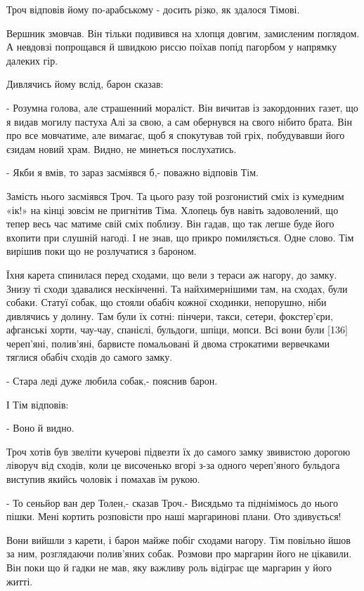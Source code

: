 Троч відповів йому по-арабському - досить різко, як здалося Тімові.

Вершник змовчав. Він тільки подивився на хлопця довгим, замисленим поглядом. А невдовзі попрощався й швидкою риссю поїхав попід пагорбом у напрямку далеких гір.

Дивлячись йому вслід, барон сказав:

- Розумна голова, але страшенний мораліст. Він вичитав із закордонних газет, що я видав могилу пастуха Алі за свою, а сам обернувся на свого нібито брата. Він про все мовчатиме, але вимагає, щоб я спокутував той гріх, побудувавши його єзидам новий храм. Видно, не минеться послухатись.

- Якби я вмів, то зараз засміявся б,- поважно відповів Тім.

Замість нього засміявся Троч. Та цього разу той розгонистий сміх із кумедним «ік!» на кінці зовсім не пригнітив Тіма. Хлопець був навіть задоволений, що тепер весь час матиме свій сміх поблизу. Він гадав, що так легше буде його вхопити при слушній нагоді. І не знав, що прикро помиляється. Одне слово. Тім вирішив поки що не розлучатися з бароном.

Їхня карета спинилася перед сходами, що вели з тераси аж нагору, до замку. Знизу ті сходи здавалися нескінченні. Та найхимернішими там, на сходах, були собаки. Статуї собак, що стояли обабіч кожної сходинки, непорушно, ніби дивлячись у долину. Там були їх сотні: пінчери, такси, сетери, фокстер'єри, афганські хорти, чау-чау, спанієлі, бульдоги, шпіци, мопси. Всі вони були [136] череп'яні, полив'яні, барвисте помальовані й двома строкатими вервечками тяглися обабіч сходів до самого замку.

- Стара леді дуже любила собак,- пояснив барон.

І Тім відповів:

- Воно й видно.

Троч хотів був звеліти кучерові підвезти їх до самого замку звивистою дорогою ліворуч від сходів, коли це височенько вгорі з-за одного череп'яного бульдога виступив якийсь чоловік і помахав їм рукою.

- То сеньйор ван дер Толен,- сказав Троч.- Висядьмо та піднімімось до нього пішки. Мені кортить розповісти про наші маргаринові плани. Ото здивується!

Вони вийшли з карети, і барон майже побіг сходами нагору. Тім повільно йшов за ним, розглядаючи полив'яних собак. Розмови про маргарин його не цікавили. Він поки що й гадки не мав, яку важливу роль відіграє ще маргарин у його житті.

